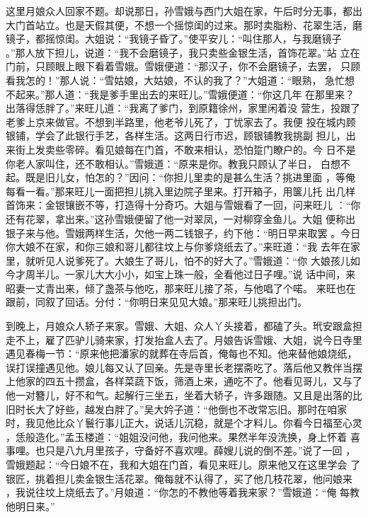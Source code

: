 这里月娘众人回家不题。却说那日，孙雪娥与西门大姐在家，午后时分无事，都出
大门首站立。也是天假其便，不想一个摇惊闺的过来。那时卖脂粉、花翠生活，磨
镜子，都摇惊闺。大姐说：“我镜子昏了。”使平安儿：“叫住那人，与我磨镜子
。”那人放下担儿，说道：“我不会磨镜子，我只卖些金银生活，首饰花翠。”站
立在门前，只顾眼上眼下看着雪娥。雪娥便道：“那汉子，你不会磨镜子，去罢，
只顾看我怎的！”那人说：“雪姑娘，大姑娘，不认的我了？”大姐道：“眼熟，
急忙想不起来。”那人道：“我是爹手里出去的来旺儿。”雪娥便道：“你这几年
在那里来？出落得恁胖了。”来旺儿道：“我离了爹门，到原籍徐州，家里闲着没
营生，投跟了老爹上京来做官。不想到半路里，他老爷儿死了，丁忧家去了。我便
投在城内顾银铺，学会了此银行手艺，各样生活。这两日行市迟，顾银铺教我挑副
担儿，出来街上发卖些零碎。看见娘每在门首，不敢来相认，恐怕踅门瞭户的。今
日不是你老人家叫住，还不敢相认。”雪娥道：“原来是你。教我只顾认了半日，
白想不起。既是旧儿女，怕怎的？”因问：“你担儿里卖的是甚么生活？挑进里面
，等俺每看一看。”那来旺儿一面把担儿挑入里边院子里来。打开箱子，用箧儿托
出几样首饰来：金银镶嵌不等，打造得十分奇巧。大姐与雪娥看了一回，问来旺儿
：“你还有花翠，拿出来。”这孙雪娥便留了他一对翠凤，一对柳穿金鱼儿。大姐
便称出银子来与他。雪娥两样生活，欠他一两二钱银子，约下他：“明日早来取罢
。今日你大娘不在家，和你三娘和哥儿都往坟上与你爹烧纸去了。”来旺道：“我
去年在家里，就听见人说爹死了。大娘生了哥儿，怕不的好大了。”雪娥道：“你
大娘孩儿如今才周半儿。一家儿大大小小，如宝上珠一般，全看他过日子哩。”说
话中间，来昭妻一丈青出来，倾了盏茶与他吃，那来旺儿接了茶，与他唱了个喏。
来旺也在跟前，同叙了回话。分付：“你明日来见见大娘。”那来旺儿挑担出门。

到晚上，月娘众人轿子来家。雪娥、大姐、众人丫头接着，都磕了头。玳安跟盒担
走不上，雇了匹驴儿骑来家，打发抬盒人去了。月娘告诉雪娥、大姐，说今日寺里
遇见春梅一节：“原来他把潘家的就葬在寺后首，俺每也不知。他来替他娘烧纸，
误打误撞遇见他。娘儿每又认了回亲。先是寺里长老摆斋吃了。落后他又教伴当摆
上他家的四五十攒盒，各样菜蔬下饭，筛酒上来，通吃不了。他看见哥儿，又与了
他一对簪儿，好不和气。起解行三坐五，坐着大轿子，许多跟随。又且是出落的比
旧时长大了好些，越发白胖了。”吴大妗子道：“他倒也不改常忘旧。那时在咱家
时，我见他比众丫鬟行事儿正大，说话儿沉稳，就是个才料儿。你看今日福至心灵
，恁般造化。”孟玉楼道：“姐姐没问他，我问他来。果然半年没洗换，身上怀着
喜事哩。也只是八九月里孩子，守备好不喜欢哩。薛嫂儿说的倒不差。”说了一回
，雪娥题起：“今日娘不在，我和大姐在门首，看见来旺儿。原来他又在这里学会
了银匠，挑着担儿卖金银生活花翠。俺每就不认得了，买了他几枝花翠，他问娘来
，我说往坟上烧纸去了。”月娘道：“你怎的不教他等着我来家？”雪娥道：“俺
每教他明日来。”

